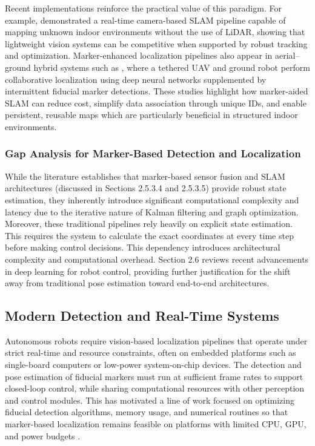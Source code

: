 Recent implementations reinforce the practical value of this paradigm. For example, \cite{Tolenov2024SelfLocalizationMapping} demonstrated a real-time camera-based SLAM pipeline capable of mapping unknown indoor environments without the use of LiDAR, showing that lightweight vision systems can be competitive when supported by robust tracking and optimization. Marker-enhanced localization pipelines also appear in aerial–ground hybrid systems such as \cite{Asif2020TetheredDroneLocalization}, where a tethered UAV and ground robot perform collaborative localization using deep neural networks supplemented by intermittent fiducial marker detections. These studies highlight how marker-aided SLAM can reduce cost, simplify data association through unique IDs, and enable persistent, reusable maps which are particularly beneficial in structured indoor environments.

\subsubsection{Gap Analysis for Marker-Based Detection and Localization}
While the literature establishes that marker-based sensor fusion and SLAM architectures (discussed in Sections 2.5.3.4 and 2.5.3.5) provide robust state estimation, they inherently introduce significant computational complexity and latency due to the iterative nature of Kalman filtering and graph optimization. Moreover, these traditional pipelines rely heavily on explicit state estimation. This requires the system to calculate the exact coordinates at every time step before making control decisions. This dependency introduces architectural complexity and computational overhead. Section 2.6 reviews recent advancements in deep learning for robot control, providing further justification for the shift away from traditional pose estimation toward end-to-end architectures.

\subsection{Modern Detection and Real-Time Systems}
Autonomous robots require vision-based localization pipelines that operate under strict real-time and resource constraints, often on embedded platforms such as single-board computers or low-power system-on-chip devices. The detection and pose estimation of fiducial markers must run at sufficient frame rates to support closed-loop control, while sharing computational resources with other perception and control modules. This has motivated a line of work focused on optimizing fiducial detection algorithms, memory usage, and numerical routines so that marker-based localization remains feasible on platforms with limited CPU, GPU, and power budgets \cite{Yulianto2025LightweightArucoDetection}.

